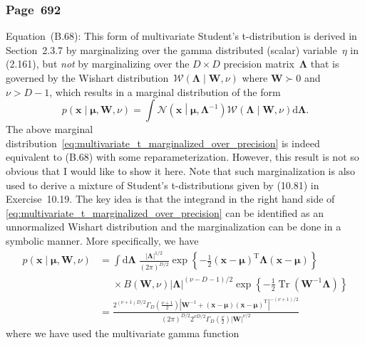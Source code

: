 \documentclass[12pt,a4paper]{article}
\newcommand{\erratum}[1]{%
\subsubsection*{#1}
\addcontentsline{toc}{subsection}{#1}}
\begin{document}
\erratum{Page~692}
Equation~(B.68):
This form of multivariate Student's t-distribution is derived in Section~2.3.7
by marginalizing over the gamma distributed (scalar) variable~$\eta$ in (2.161),
but \emph{not} by marginalizing over
the $D \times D$ precision matrix~$\bm{\Lambda}$ that is governed by
the Wishart distribution~$\mathcal{W}\left(\bm{\Lambda}\middle|\mathbf{W}, \nu\right)$
where $\mathbf{W} \succ 0$ and $\nu > D - 1$,
which results in a marginal distribution of the form
\begin{equation}
p\left(\mathbf{x}\middle|\bm{\mu}, \mathbf{W}, \nu\right) =
  \int \mathcal{N}\left(\mathbf{x}\middle|\bm{\mu}, \bm{\Lambda}^{-1}\right)
    \mathcal{W}\left(\bm{\Lambda}\middle|\mathbf{W}, \nu\right) \mathrm{d}\bm{\Lambda} .
\label{eq:multivariate_t_marginalized_over_precision}
\end{equation}
The above marginal distribution~\eqref{eq:multivariate_t_marginalized_over_precision} is indeed
equivalent to (B.68) with some reparameterization.
However, this result is not so obvious that I would like to show it here.
Note that such marginalization is also used to derive
a mixture of Student's t-distributions given by (10.81) in Exercise~10.19.
The key idea is that the integrand in the right hand side of
\eqref{eq:multivariate_t_marginalized_over_precision} can be identified as an unnormalized
Wishart distribution and the marginalization can be done in a symbolic manner.
More specifically, we have
\begin{align}
p\left(\mathbf{x}\middle|\bm{\mu}, \mathbf{W}, \nu\right)
&=
\int \mathrm{d}\bm{\Lambda} \; \frac{\left|\bm{\Lambda}\right|^{1/2}}{\left(2\pi\right)^{D/2}}
  \exp\left\{-\frac{1}{2}
    \left(\mathbf{x} - \bm{\mu}\right)^{\operatorname{T}}
    \bm{\Lambda}
    \left(\mathbf{x} - \bm{\mu}\right)
  \right\} \nonumber \\
&\phantom{=} \times
B\left(\mathbf{W}, \nu\right) \left|\bm{\Lambda}\right|^{(\nu - D - 1)/2}
  \exp\left\{
    -\frac{1}{2} \operatorname{Tr}\left( \mathbf{W}^{-1}\bm{\Lambda} \right)
  \right\}  \\
&=
\frac{
  2^{(\nu + 1)D/2} \Gamma_D \left(\frac{\nu + 1}{2}\right)
  \left| \mathbf{W}^{-1} +
    \left(\mathbf{x} - \bm{\mu}\right)\left(\mathbf{x} - \bm{\mu}\right)^{\operatorname{T}}
  \right|^{-(\nu + 1)/2}
}{
  \left(2\pi\right)^{D/2}
  2^{\nu D/2} \Gamma_D \left(\frac{\nu}{2}\right) \left|\mathbf{W}\right|^{\nu/2}
}
\end{align}
where we have used the multivariate gamma function~\citep{Anderson:Multivariate,NIST:DLMF}
\end{document}
